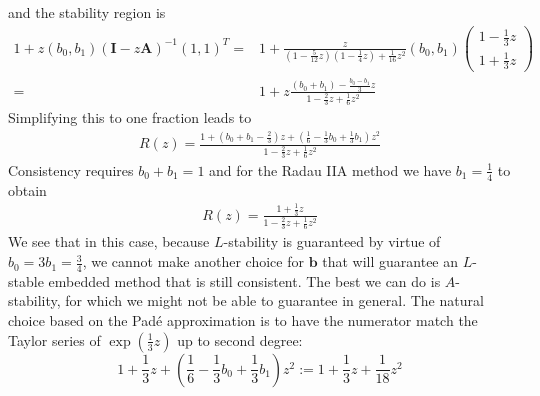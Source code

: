 \documentclass[10pt,a4paper]{article}
\newcommand{\bvec}[1]{\mathbf{#1}}
\begin{document}
and the stability region is
\begin{align*}
  1 + z (b_0, b_1) (\bvec{I}-z\bvec{A})^{-1}(1,1)^T =& 1 + \frac{z}{(1-\frac{5}{12}z)(1-\frac{1}{4}z) + \frac{1}{16}z^2} (b_0, b_1) \begin{pmatrix}
    1 - \frac{1}{3}z \\
    1 + \frac{1}{3}z
  \end{pmatrix} \\
  =& 1 + z\frac{(b_0 + b_1) - \frac{b_0-b_1}{3}z}{1 - \frac{2}{3}z + \frac{1}{6}z^2}
\end{align*}
Simplifying this to one fraction leads to
\begin{align*}
  R(z) = \frac{1 + \left(b_0 + b_1 - \frac{2}{3}\right)z + \left(\frac{1}{6}-\frac{1}{3}b_0+\frac{1}{3}b_1\right)z^2}{1 - \frac{2}{3}z + \frac{1}{6}z^2}
\end{align*}
Consistency requires $b_0+b_1=1$ and for the Radau IIA method we have $b_1=\frac{1}{4}$ to obtain
\begin{align*}
  R(z) = \frac{1 + \frac{1}{3}z}{1 - \frac{2}{3}z + \frac{1}{6}z^2}
\end{align*}
We see that in this case, because $L$-stability is guaranteed by virtue of $b_0=3b_1=\frac{3}{4}$, we cannot make another choice for $\bvec{b}$ that will guarantee an $L$-stable embedded method that is still consistent. The best we can do is $A$-stability, for which we might not be able to guarantee in general.
The natural choice based on the Pad\'{e} approximation is to have the numerator match the Taylor series of $\exp(\frac{1}{3}z)$ up to second degree:
\begin{equation*}
  1 + \frac{1}{3}z + \left(\frac{1}{6}-\frac{1}{3}b_0+\frac{1}{3}b_1\right)z^2 := 1 + \frac{1}{3}z + \frac{1}{18}z^2
\end{equation*}
\end{document}

